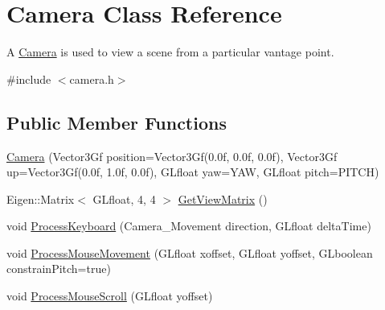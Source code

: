 \hypertarget{classCamera}{}\section{Camera Class Reference}
\label{classCamera}


A \hyperlink{classCamera}{Camera} is used to view a scene from a particular vantage point.  




{\ttfamily \#include $<$camera.\+h$>$}

\subsection*{Public Member Functions}
\begin{DoxyCompactItemize}
\item 
\hyperlink{classCamera_a852d8c105b562be494204cac8518b66f}{Camera} (Vector3\+Gf position=Vector3\+Gf(0.\+0f, 0.\+0f, 0.\+0f), Vector3\+Gf up=\+Vector3\+Gf(0.\+0f, 1.\+0f, 0.\+0f), G\+Lfloat yaw=\+Y\+A\+W, G\+Lfloat pitch=\+P\+I\+T\+C\+H)
\item 
Eigen\+::\+Matrix$<$ G\+Lfloat, 4, 4 $>$ \hyperlink{classCamera_af040480b69b4235d9bd203bf6775e79a}{Get\+View\+Matrix} ()
\item 
void \hyperlink{classCamera_ac7e9a7f3e63c670fd695a8f03d02dbdf}{Process\+Keyboard} (Camera\+\_\+\+Movement direction, G\+Lfloat delta\+Time)
\item 
void \hyperlink{classCamera_a97ffbf8d8935fc63bd2ca71a4268eec4}{Process\+Mouse\+Movement} (G\+Lfloat xoffset, G\+Lfloat yoffset, G\+Lboolean constrain\+Pitch=true)
\item 
void \hyperlink{classCamera_af269e5ef38e791afb7f4a1dfb8da2399}{Process\+Mouse\+Scroll} (G\+Lfloat yoffset)
\end{DoxyCompactItemize}
